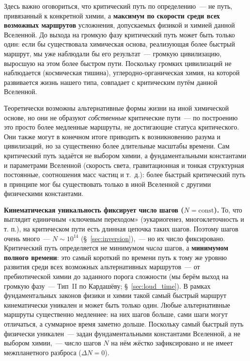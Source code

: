 \documentclass[12pt,a4paper]{article}
\begin{document}
Здесь важно оговориться, что критический путь по определению~--- не путь, привязанный к конкретной химии, а \textbf{максимум по скорости среди всех возможных маршрутов} усложнения, допускаемых физикой и химией данной Вселенной. До выхода на громкую фазу критический путь может быть только один: если бы существовала химическая основа, реализующая более быстрый маршрут, мы уже наблюдали бы его результат~--- громкую цивилизацию, выросшую на этом более быстром пути. Поскольку громких цивилизаций не наблюдается (космическая тишина), углеродно-органическая химия, на которой развивается жизнь нашего типа, совпадает с критическим путём данной Вселенной.

Теоретически возможны альтернативные формы жизни на иной химической основе, но они не образуют \emph{собственные} критические пути~--- по построению это просто более медленные маршруты, не достигающие статуса критического. Они также могут в конечном итоге приводить к возникновению разума и цивилизаций, но за существенно более длительные масштабы времени. Сам критический путь задаётся не выбором химии, а фундаментальными константами и параметрами Вселенной (скорость света, гравитационная и тонкая структурная постоянные, соотношения масс частиц и т.~д.): более быстрый критический путь в принципе мог бы существовать только в иной Вселенной с другими физическими константами.

\textbf{Кинематическая уникальность фиксирует число шагов ($N = \mathrm{const}$).} То, что выглядит единичным «ключевым переходом» (эукариогенез, многоклеточность и т. п.), на критическом пути есть длинная цепочка таких шагов. Поэтому шагов очень много~--- $N \sim 10^{14}$ (\S~\ref{sec:inversion}),~--- но их число фиксировано. Критический путь определяется не минимумом \emph{числа} шагов, а \textbf{минимумом полного времени}: это самый короткий по времени путь к тому же уровню развития среди всех возможных альтернативных маршрутов~--- от пребиотической химии до заданного порога сложности (мы берём выход на громкую фазу~--- Тип~II по Кардашёву; \S~\ref{sec:loud_time}). В рамках фундаментальных законов физики и химии такой самый быстрый маршрут кинематически уникален и может быть только один. Любые альтернативные маршруты существенно медленнее: на них шагов больше, сами шаги могут отличаться, а суммарное время заметно дольше. Поскольку самый быстрый путь физически уникален~--- задан фундаментальными константами Вселенной, а не выбором химии,~--- число шагов $N$ на нём жёстко зафиксировано и не имеет межпланетного разброса ($\Delta N = 0$).
\end{document}

